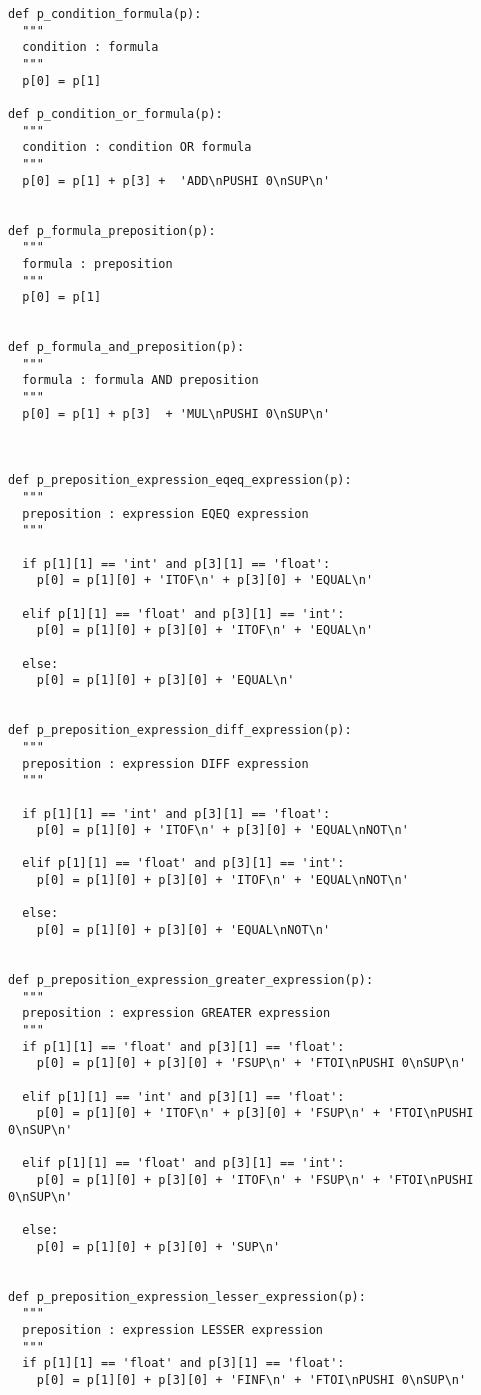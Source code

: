 \documentclass[11pt,a4paper]{report}%
\begin{document}
\begin{scriptsize}
\begin{verbatim}
def p_condition_formula(p):
  """
  condition : formula
  """
  p[0] = p[1]

def p_condition_or_formula(p):
  """
  condition : condition OR formula
  """
  p[0] = p[1] + p[3] +  'ADD\nPUSHI 0\nSUP\n'


def p_formula_preposition(p):
  """
  formula : preposition
  """
  p[0] = p[1]


def p_formula_and_preposition(p):
  """
  formula : formula AND preposition
  """
  p[0] = p[1] + p[3]  + 'MUL\nPUSHI 0\nSUP\n'



def p_preposition_expression_eqeq_expression(p):
  """
  preposition : expression EQEQ expression
  """

  if p[1][1] == 'int' and p[3][1] == 'float':
    p[0] = p[1][0] + 'ITOF\n' + p[3][0] + 'EQUAL\n'
  
  elif p[1][1] == 'float' and p[3][1] == 'int':
    p[0] = p[1][0] + p[3][0] + 'ITOF\n' + 'EQUAL\n'

  else:
    p[0] = p[1][0] + p[3][0] + 'EQUAL\n'
  

def p_preposition_expression_diff_expression(p):
  """
  preposition : expression DIFF expression
  """

  if p[1][1] == 'int' and p[3][1] == 'float':
    p[0] = p[1][0] + 'ITOF\n' + p[3][0] + 'EQUAL\nNOT\n'
  
  elif p[1][1] == 'float' and p[3][1] == 'int':
    p[0] = p[1][0] + p[3][0] + 'ITOF\n' + 'EQUAL\nNOT\n'

  else:
    p[0] = p[1][0] + p[3][0] + 'EQUAL\nNOT\n'


def p_preposition_expression_greater_expression(p):
  """
  preposition : expression GREATER expression
  """
  if p[1][1] == 'float' and p[3][1] == 'float':
    p[0] = p[1][0] + p[3][0] + 'FSUP\n' + 'FTOI\nPUSHI 0\nSUP\n'

  elif p[1][1] == 'int' and p[3][1] == 'float':
    p[0] = p[1][0] + 'ITOF\n' + p[3][0] + 'FSUP\n' + 'FTOI\nPUSHI 0\nSUP\n'
  
  elif p[1][1] == 'float' and p[3][1] == 'int':
    p[0] = p[1][0] + p[3][0] + 'ITOF\n' + 'FSUP\n' + 'FTOI\nPUSHI 0\nSUP\n'

  else:
    p[0] = p[1][0] + p[3][0] + 'SUP\n'


def p_preposition_expression_lesser_expression(p):
  """
  preposition : expression LESSER expression
  """
  if p[1][1] == 'float' and p[3][1] == 'float':
    p[0] = p[1][0] + p[3][0] + 'FINF\n' + 'FTOI\nPUSHI 0\nSUP\n'


\end{verbatim}
\end{scriptsize}
\end{document}
